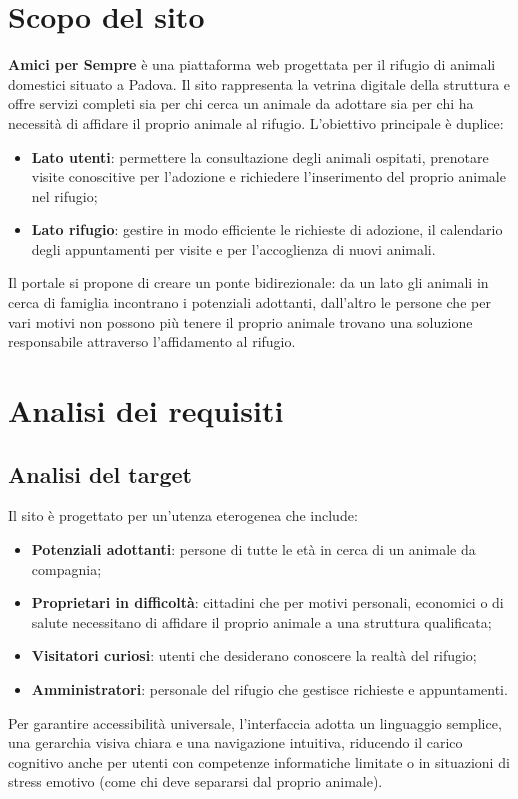 \documentclass[a4paper,10pt]{article}
\begin{document}
	\section{Scopo del sito}

	\textbf{Amici per Sempre} è una piattaforma web progettata per il rifugio di animali domestici situato a Padova. Il sito rappresenta la vetrina digitale della struttura e offre servizi completi sia per chi cerca un animale da adottare sia per chi ha necessità di affidare il proprio animale al rifugio.
    L'obiettivo principale è duplice:
	\begin{itemize}
		\item \textbf{Lato utenti}: permettere la consultazione degli animali ospitati, prenotare visite conoscitive per l'adozione e richiedere l'inserimento del proprio animale nel rifugio;
		\item \textbf{Lato rifugio}: gestire in modo efficiente le richieste di adozione, il calendario degli appuntamenti per visite e per l'accoglienza di nuovi animali.
	\end{itemize}
    Il portale si propone di creare un ponte bidirezionale: da un lato gli animali in cerca di famiglia incontrano i potenziali adottanti, dall'altro le persone che per vari motivi non possono più tenere il proprio animale trovano una soluzione responsabile attraverso l'affidamento al rifugio.
	\section{Analisi dei requisiti}
	\subsection{Analisi del target}
    Il sito è progettato per un'utenza eterogenea che include:
    \begin{itemize}
	\item \textbf{Potenziali adottanti}: persone di tutte le età in cerca di un animale da compagnia;
	\item \textbf{Proprietari in difficoltà}: cittadini che per motivi personali, economici o di salute necessitano di affidare il proprio animale a una struttura qualificata;
	\item \textbf{Visitatori curiosi}: utenti che desiderano conoscere la realtà del rifugio;
	\item \textbf{Amministratori}: personale del rifugio che gestisce richieste e appuntamenti.
    \end{itemize}
    Per garantire accessibilità universale, l'interfaccia adotta un linguaggio semplice, una gerarchia visiva chiara e una navigazione intuitiva, riducendo il carico cognitivo anche per utenti con competenze informatiche limitate o in situazioni di stress emotivo (come chi deve separarsi dal proprio animale).
\end{document}
